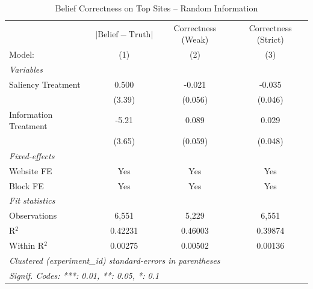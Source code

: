 
\begin{table}[htbp]
   \caption{Belief Correctness on Top Sites -- Random Information}
   \centering
   \begin{tabular}{lccc}
      \tabularnewline \midrule \midrule
                            & $\lvert \text{Belief} - \text{Truth} \rvert$     & Correctness (Weak) & Correctness (Strict) \\   
      Model:                & (1)                                              & (2)                & (3)\\  
      \midrule
      \emph{Variables}\\
      Saliency Treatment    & 0.500                                            & -0.021             & -0.035\\   
                            & (3.39)                                           & (0.056)            & (0.046)\\   
      Information Treatment & -5.21                                            & 0.089              & 0.029\\   
                            & (3.65)                                           & (0.059)            & (0.048)\\   
      \midrule
      \emph{Fixed-effects}\\
      Website FE            & Yes                                              & Yes                & Yes\\  
      Block FE              & Yes                                              & Yes                & Yes\\  
      \midrule
      \emph{Fit statistics}\\
      Observations          & 6,551                                            & 5,229              & 6,551\\  
      R$^2$                 & 0.42231                                          & 0.46003            & 0.39874\\  
      Within R$^2$          & 0.00275                                          & 0.00502            & 0.00136\\  
      \midrule \midrule
      \multicolumn{4}{l}{\emph{Clustered (experiment\_id) standard-errors in parentheses}}\\
      \multicolumn{4}{l}{\emph{Signif. Codes: ***: 0.01, **: 0.05, *: 0.1}}\\
   \end{tabular}
\end{table}


